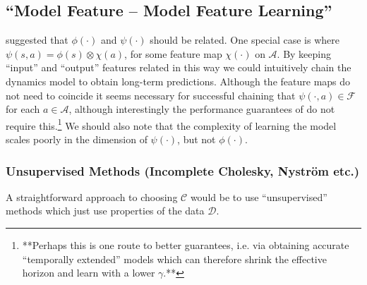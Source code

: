 \documentclass[letterpaper]{article}
\newcommand{\GrunewalderEmbeddingsRL}{GrunewalderEmbeddingsMDP}
\newcommand{\CsabaPersonalCommunication}{CsabaPersonalCommunication}
\newcommand{\cD}{{\mathcal D}}
\newcommand{\cC}{{\mathcal C}}
\newcommand{\cF}{{\mathcal F}}
\newcommand{\cA}{{\mathcal A}}
\begin{document}
\subsection{``Model Feature -- Model Feature Learning''}

\cite{\CsabaPersonalCommunication} suggested that $\phi(\cdot)$ and $\psi(\cdot)$ should be related. One special case is where $\psi(s,a) = \phi(s)\otimes\chi(a)$, for some feature map $\chi(\cdot)$ on $\cA$. By keeping ``input'' and ``output'' features related in this way we could intuitively chain the dynamics model to obtain long-term predictions. Although the feature maps do not need to coincide it seems necessary for successful chaining that $\psi(\cdot,a)\in\cF$ for each $a\in\cA$, although interestingly the performance guarantees of \cite{\GrunewalderEmbeddingsRL} do not require this.\footnote{**Perhaps this is one route to better guarantees, i.e. via obtaining accurate ``temporally extended'' models which can therefore shrink the effective horizon and learn with a lower $\gamma$.**} We should also note that the complexity of learning the model scales poorly in the dimension of $\psi(\cdot)$, but not $\phi(\cdot)$.




\subsubsection{Unsupervised Methods (Incomplete Cholesky, Nystr\"{o}m etc.)}

A straightforward approach to choosing $\cC$ would be to use  ``unsupervised'' methods which just use properties of the data $\cD$.
\end{document}
